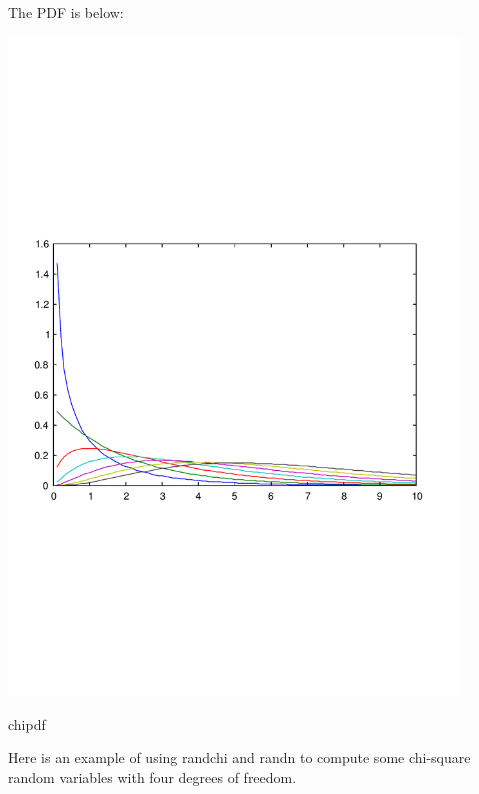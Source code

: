 The P\-D\-F is below\-:  
\begin{DoxyImage}
\includegraphics[width=12cm]{chipdf}
\caption{chipdf}
\end{DoxyImage}
 Here is an example of using {\ttfamily randchi} and {\ttfamily randn} to compute some chi-\/square random variables with four degrees of freedom.


